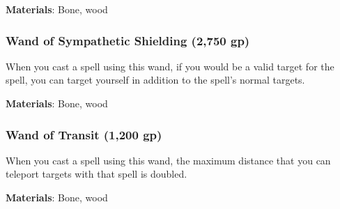 \textbf{Materials}: Bone, wood


\lowercase{\hypertarget{item:Wand of Sympathetic Shielding}{}}\label{item:Wand of Sympathetic Shielding}
\hypertarget{item:Wand of Sympathetic Shielding}{\subsubsection{Wand of Sympathetic Shielding\hfill{} (2,750 gp)}}

When you cast a   spell using this wand,
if you would be a valid target for the spell,
you can target yourself in addition to the spell's normal targets.



\textbf{Materials}: Bone, wood


\lowercase{\hypertarget{item:Wand of Transit}{}}\label{item:Wand of Transit}
\hypertarget{item:Wand of Transit}{\subsubsection{Wand of Transit\hfill{} (1,200 gp)}}

When you cast a  spell using this wand,
the maximum distance that you can teleport targets with that spell is doubled.



\textbf{Materials}: Bone, wood
